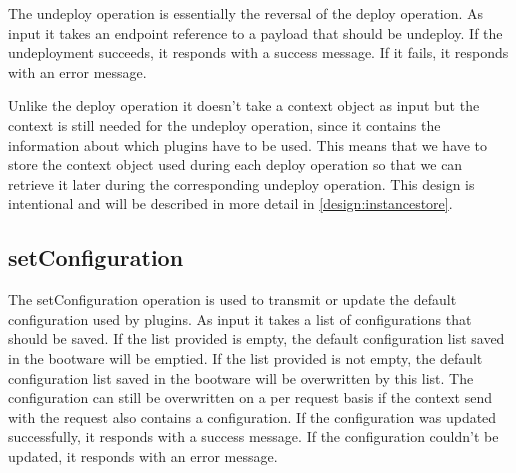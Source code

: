 The undeploy operation is essentially the reversal of the deploy operation.
As input it takes an endpoint reference to a payload that should be undeploy.
If the undeployment succeeds, it responds with a success message.
If it fails, it responds with an error message.

Unlike the deploy operation it doesn't take a context object as input but the context is still needed for the undeploy operation, since it contains the information about which plugins have to be used.
This means that we have to store the context object used during each deploy operation so that we can retrieve it later during the corresponding undeploy operation.
This design is intentional and will be described in more detail in \autoref{design:instancestore}.

\subsection{setConfiguration}

The setConfiguration operation is used to transmit or update the default configuration used by plugins.
As input it takes a list of configurations that should be saved.
If the list provided is empty, the default configuration list saved in the bootware will be emptied.
If the list provided is not empty, the default configuration list saved in the bootware will be overwritten by this list.
The configuration can still be overwritten on a per request basis if the context send with the request also contains a configuration.
If the configuration was updated successfully, it responds with a success message.
If the configuration couldn't be updated, it responds with an error message.
